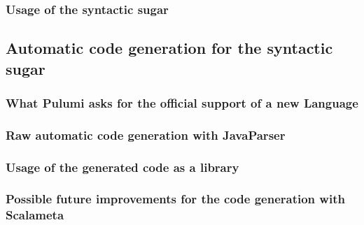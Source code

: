 \subsubsection{Usage of the syntactic sugar}

\subsection{Automatic code generation for the syntactic sugar}

\subsubsection{What Pulumi asks for the official support of a new Language}

\subsubsection{Raw automatic code generation with JavaParser}

\subsubsection{Usage of the generated code as a library}

\subsubsection{Possible future improvements for the code generation with Scalameta}
